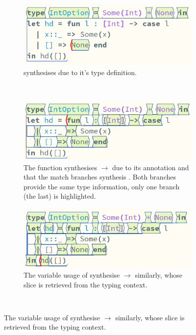 \begin{figure}[h]
\centering
\begin{subfigure}[t]{0.45\textwidth}
\centering
\includegraphics[width=1\textwidth]{Media/Figures/none_syn}
\caption{ synthesises  due to it's type definition.}
\end{subfigure}$\qquad$
\begin{subfigure}[t]{0.45\textwidth}
\centering
\includegraphics[width=1\textwidth]{Media/Figures/fun_syn}
\caption{The function synthesises \code{[Int]}$\to$  due to its \code{[Int]} annotation and that the match branches synthesis . Both branches provide the same type information, only one branch (the last) is highlighted.}
\end{subfigure}
\begin{subfigure}[t]{0.45\textwidth}
\centering
\includegraphics[width=1\textwidth]{Media/Figures/hd_syn}
\caption{The variable usage of  synthesise \code{[Int]}$\to$  similarly, whose slice is retrieved from the typing context.}
\end{subfigure}$\qquad$

\end{figure}
